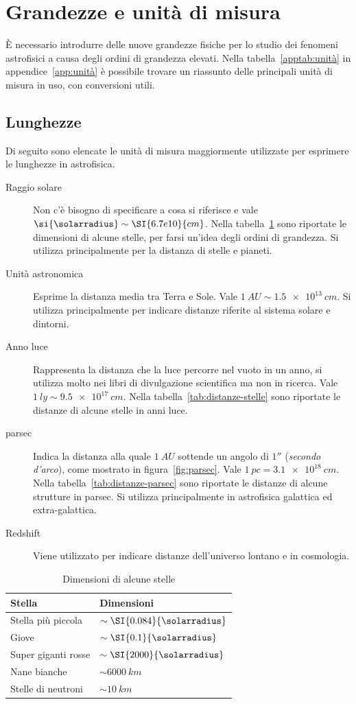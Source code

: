 \section{Grandezze e unità di misura}\label{sec:unità}
È necessario introdurre delle nuove grandezze fisiche per lo studio dei fenomeni astrofisici a causa degli ordini di grandezza elevati. Nella tabella~\ref{apptab:unità} in appendice~\ref{app:unità} è possibile trovare un riassunto delle principali unità di misura in uso, con conversioni utili.
\subsection{Lunghezze}
Di seguito sono elencate le unità di misura maggiormente utilizzate per esprimere le lunghezze in astrofisica.
\begin{description}
    \item[Raggio solare] Non c'è bisogno di specificare a cosa si riferisce e vale $\si{\solarradius} \sim \SI{6.7e10}{cm}$. Nella tabella~\ref{tab:dimensioni-stelle} sono riportate le dimensioni di alcune stelle, per farsi un'idea degli ordini di grandezza. Si utilizza principalmente per la distanza di stelle e pianeti.
    \item[Unità astronomica] Esprime la distanza media tra Terra e Sole. Vale $\SI{1}{AU} \sim \SI{1.5e13}{cm}$. Si utilizza principalmente per indicare distanze riferite al sistema solare e dintorni.
    \item[Anno luce] Rappresenta la distanza che la luce percorre nel vuoto in un anno, si utilizza molto nei libri di divulgazione scientifica ma non in ricerca. Vale $\SI{1}{ly} \sim \SI{9.5e17}{cm}$. Nella tabella~\ref{tab:distanze-stelle} sono riportate le distanze di alcune stelle in anni luce.
    \item[parsec] Indica la distanza alla quale $\SI{1}{AU}$ sottende un angolo di $\ang{;;1}$ (\emph{secondo d'arco}), come mostrato in figura~\ref{fig:parsec}. Vale $\SI{1}{pc} = \SI{3.1e18}{cm}$. Nella tabella~\ref{tab:distanze-parsec} sono riportate le distanze di alcune strutture in parsec. Si utilizza principalmente in astrofisica galattica ed extra-galattica.
    \item[Redshift] Viene utilizzato per indicare distanze dell'universo lontano e in cosmologia.
\end{description}

\begin{table}
\caption{Dimensioni di alcune stelle}
\label{tab:dimensioni-stelle}
\centering
\begin{tabular}{ll}
\toprule
Stella & Dimensioni \\
\midrule
Stella più piccola          & $\sim \SI{0.084}{\solarradius}$ \\
Giove           & $\sim \SI{0.1}{\solarradius}$    \\
Super giganti rosse             & $\sim \SI{2000}{\solarradius}$  \\
Nane bianche & $\sim \SI{6000}{km}$  \\
Stelle di neutroni & $\sim \SI{10}{km}$  \\
\bottomrule
\end{tabular}
\end{table}

